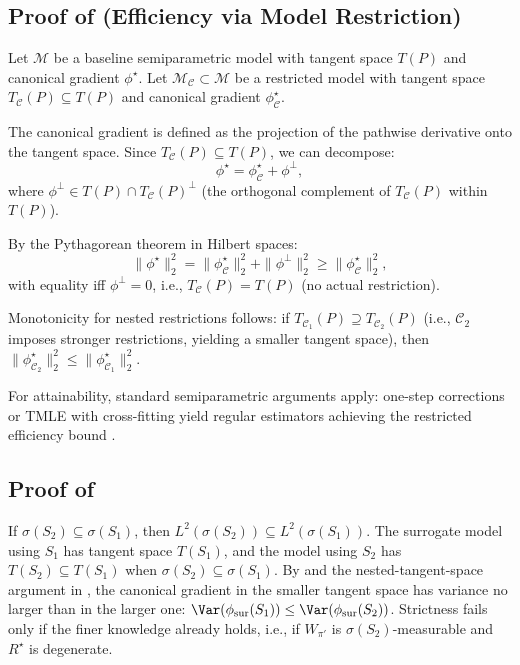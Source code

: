 \subsection{Proof of \texorpdfstring{}{Theorem 2} (Efficiency via Model Restriction)}
\label{app:proof-ckp}
Let $\mathcal{M}$ be a baseline semiparametric model with tangent space $T(P)$ and canonical gradient $\phi^\star$.
Let $\mathcal{M}_\mathcal{C} \subset \mathcal{M}$ be a restricted model with tangent space $T_\mathcal{C}(P) \subseteq T(P)$
and canonical gradient $\phi^\star_\mathcal{C}$.

The canonical gradient is defined as the projection of the pathwise derivative onto the tangent space.
Since $T_\mathcal{C}(P) \subseteq T(P)$, we can decompose:
\[
\phi^\star = \phi^\star_\mathcal{C} + \phi^\perp,
\]
where $\phi^\perp \in T(P) \cap T_\mathcal{C}(P)^\perp$ (the orthogonal complement of $T_\mathcal{C}(P)$ within $T(P)$).

By the Pythagorean theorem in Hilbert spaces:
\[
\|\phi^\star\|_2^2 = \|\phi^\star_\mathcal{C}\|_2^2 + \|\phi^\perp\|_2^2 \ge \|\phi^\star_\mathcal{C}\|_2^2,
\]
with equality iff $\phi^\perp = 0$, i.e., $T_\mathcal{C}(P) = T(P)$ (no actual restriction).

Monotonicity for nested restrictions follows: if $T_{\mathcal{C}_1}(P) \supseteq T_{\mathcal{C}_2}(P)$ (i.e., $\mathcal{C}_2$ imposes stronger restrictions, yielding a smaller tangent space), then $\|\phi^\star_{\mathcal{C}_2}\|_2^2 \le \|\phi^\star_{\mathcal{C}_1}\|_2^2$.

For attainability, standard semiparametric arguments apply: one-step corrections or TMLE with cross-fitting
yield regular estimators achieving the restricted efficiency bound \citep{Bickel1993,VaartWellner2000,vanDerLaanRose2011TL}.

\subsection{Proof of \texorpdfstring{}{Corollary: Blackwell monotonicity}}
\label{app:proof-blackwell}
If $\sigma(S_2)\subseteq\sigma(S_1)$, then $L^2(\sigma(S_2))\subseteq L^2(\sigma(S_1))$.
The surrogate model using $S_1$ has tangent space $T(S_1)$, and the model using $S_2$ has
$T(S_2) \subseteq T(S_1)$ when $\sigma(S_2)\subseteq\sigma(S_1)$.
By  and the nested-tangent-space argument in ,
the canonical gradient in the smaller tangent space has variance no larger than in the larger one:
$\Var(\phi_{\mathrm{sur}}(S_1))\le \Var(\phi_{\mathrm{sur}}(S_2))$.
Strictness fails only if the finer knowledge already holds, i.e., if $W_{\pi'}$ is $\sigma(S_2)$-measurable and $R^\star$ is degenerate.

